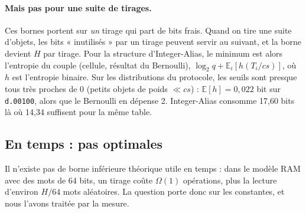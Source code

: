 \documentclass[11pt,a4paper]{article}
\newcommand{\code}[1]{\texttt{#1}}
\newcommand{\cs}{\mathit{cs}}
\begin{document}
\paragraph{Mais pas pour une suite de tirages.} Ces bornes portent sur \emph{un} tirage
qui part de bits frais. Quand on tire une suite d'objets, les bits « inutilisés » par un
tirage peuvent servir au suivant, et la borne devient $H$ par tirage. Pour la structure
d'Integer-Alias, le minimum est alors l'entropie du couple (cellule, résultat du
Bernoulli), $\log_2 q + \mathbb{E}_i[h(T_i/\cs)]$, où $h$ est l'entropie binaire. Sur
les distributions du protocole, les seuils sont presque tous très proches de 0 (petits
objets de poids $\ll \cs$) : $\mathbb{E}[h] = 0{,}022$ bit sur \code{d.00100}, alors que
le Bernoulli en dépense 2. Integer-Alias consomme 17,60 bits là où 14,34 suffisent pour
la même table.

\subsection{En temps : pas optimales}

Il n'existe pas de borne inférieure théorique utile en temps : dans le modèle RAM
avec des mots de 64 bits, un tirage coûte $\Omega(1)$ opérations, plus la lecture d'environ
$H/64$ mots aléatoires. La question porte donc sur les constantes, et nous l'avons
traitée par la mesure.
\end{document}
